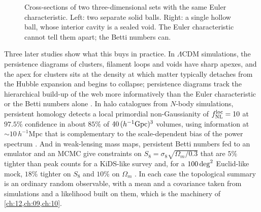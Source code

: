 \begin{figure}[htbp]
\centering
{}
\caption{Cross-sections of two three-dimensional sets with the same Euler characteristic. Left: two separate solid balls. Right: a single hollow ball, whose interior cavity is a sealed void. The Euler characteristic cannot tell them apart; the Betti numbers can.}
\label{T3a:fig:betti}
\end{figure}

Three later studies show what this buys in practice. In $\Lambda$CDM simulations, the persistence diagrams of clusters, filament loops and voids have sharp apexes, and the apex for clusters sits at the density at which matter typically detaches from the Hubble expansion and begins to collapse; persistence diagrams track the hierarchical build-up of the web more informatively than the Euler characteristic or the Betti numbers alone \cite{Wilding2021}. In halo catalogues from $N$-body simulations, persistent homology detects a local primordial non-Gaussianity of $f_{\rm NL}^{\rm loc}=10$ at $97.5\%$ confidence in about $85\%$ of $40\,(h^{-1}{\rm Gpc})^3$ volumes, using information at $\sim10\,h^{-1}$Mpc that is complementary to the scale-dependent bias of the power spectrum \cite{Biagetti2021}. And in weak-lensing mass maps, persistent Betti numbers fed to an emulator and an MCMC give constraints on $S_8=\sigma_8\sqrt{\Omega_m/0.3}$ that are $5\%$ tighter than peak counts for a KiDS-like survey and, for a $100\,{\rm deg}^2$ Euclid-like mock, $18\%$ tighter on $S_8$ and $10\%$ on $\Omega_m$ \cite{Heydenreich2021}. In each case the topological summary is an ordinary random observable, with a mean and a covariance taken from simulations and a likelihood built on them, which is the machinery of \cref{ch:12,ch:09,ch:10}.

